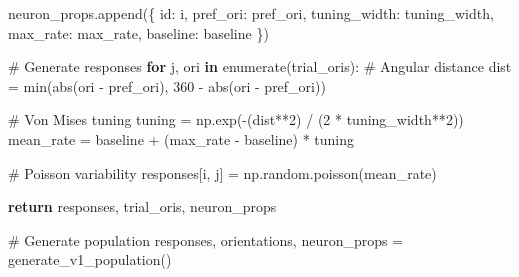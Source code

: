 \documentclass[
  11pt,
  letterpaper,
  oneside,
  openany]{book}
\newenvironment{Shaded}{\begin{snugshade}}{\end{snugshade}}
\newcommand{\BuiltInTok}[1]{\textcolor[rgb]{0.00,0.23,0.31}{#1}}
\newcommand{\CommentTok}[1]{\textcolor[rgb]{0.37,0.37,0.37}{#1}}
\newcommand{\ControlFlowTok}[1]{\textcolor[rgb]{0.00,0.23,0.31}{\textbf{#1}}}
\newcommand{\DecValTok}[1]{\textcolor[rgb]{0.68,0.00,0.00}{#1}}
\newcommand{\KeywordTok}[1]{\textcolor[rgb]{0.00,0.23,0.31}{\textbf{#1}}}
\newcommand{\NormalTok}[1]{\textcolor[rgb]{0.00,0.23,0.31}{#1}}
\newcommand{\OperatorTok}[1]{\textcolor[rgb]{0.37,0.37,0.37}{#1}}
\newcommand{\StringTok}[1]{\textcolor[rgb]{0.13,0.47,0.30}{#1}}
\begin{document}
\begin{Shaded}
\begin{Highlighting}[]
\NormalTok{        neuron\_props.append(\{}
            \StringTok{\textquotesingle{}id\textquotesingle{}}\NormalTok{: i,}
            \StringTok{\textquotesingle{}pref\_ori\textquotesingle{}}\NormalTok{: pref\_ori,}
            \StringTok{\textquotesingle{}tuning\_width\textquotesingle{}}\NormalTok{: tuning\_width,}
            \StringTok{\textquotesingle{}max\_rate\textquotesingle{}}\NormalTok{: max\_rate,}
            \StringTok{\textquotesingle{}baseline\textquotesingle{}}\NormalTok{: baseline}
\NormalTok{        \})}
        
        \CommentTok{\# Generate responses}
        \ControlFlowTok{for}\NormalTok{ j, ori }\KeywordTok{in} \BuiltInTok{enumerate}\NormalTok{(trial\_oris):}
            \CommentTok{\# Angular distance}
\NormalTok{            dist }\OperatorTok{=} \BuiltInTok{min}\NormalTok{(}\BuiltInTok{abs}\NormalTok{(ori }\OperatorTok{{-}}\NormalTok{ pref\_ori), }\DecValTok{360} \OperatorTok{{-}} \BuiltInTok{abs}\NormalTok{(ori }\OperatorTok{{-}}\NormalTok{ pref\_ori))}
            
            \CommentTok{\# Von Mises tuning}
\NormalTok{            tuning }\OperatorTok{=}\NormalTok{ np.exp(}\OperatorTok{{-}}\NormalTok{(dist}\OperatorTok{**}\DecValTok{2}\NormalTok{) }\OperatorTok{/}\NormalTok{ (}\DecValTok{2} \OperatorTok{*}\NormalTok{ tuning\_width}\OperatorTok{**}\DecValTok{2}\NormalTok{))}
\NormalTok{            mean\_rate }\OperatorTok{=}\NormalTok{ baseline }\OperatorTok{+}\NormalTok{ (max\_rate }\OperatorTok{{-}}\NormalTok{ baseline) }\OperatorTok{*}\NormalTok{ tuning}
            
            \CommentTok{\# Poisson variability}
\NormalTok{            responses[i, j] }\OperatorTok{=}\NormalTok{ np.random.poisson(mean\_rate)}
    
    \ControlFlowTok{return}\NormalTok{ responses, trial\_oris, neuron\_props}

\CommentTok{\# Generate population}
\NormalTok{responses, orientations, neuron\_props }\OperatorTok{=}\NormalTok{ generate\_v1\_population()}


\end{Highlighting}
\end{Shaded}
\end{document}
